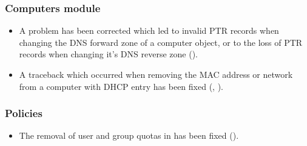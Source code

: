 \subsubsection{Computers module}
\begin{itemize}
\item A problem has been corrected which led to invalid PTR records when
  changing the DNS forward zone of a computer object, or to the loss of PTR
  records when changing it's DNS reverse zone ().
\item A traceback which occurred when removing the MAC address or network from
  a computer with DHCP entry has been fixed (, ).
\end{itemize}

\subsubsection{Policies}
\begin{itemize}

\item The removal of user and group quotas in 
has been fixed ().

\end{itemize}





